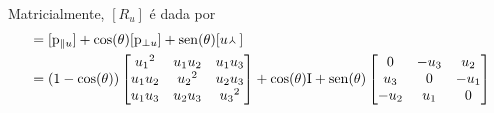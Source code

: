 Matricialmente, $[R_u]$ é dada por
%
	\begin{align*}
	[R_u] &= [\proj_{\parallel u}] + \cos(\theta)[\proj_{\perp u}] + \sin(\theta)[\pvec{u\!}{}] \\
	&=
	(1-\cos(\theta))
	\begin{bmatrix}
			{u_1}^2 & u_1u_2 & u_1u_3 \\
			u_1u_2 & {u_2}^2 & u_2u_3 \\
			u_1u_3 & u_2u_3 & {u_3}^2
	\end{bmatrix}
	+
	\cos(\theta)\Id + \sin(\theta)
	\begin{bmatrix}
			0 & -u_3 & u_2 \\
			u_3 & 0 & -u_1 \\
			-u_2 & u_1 & 0
	\end{bmatrix}
	\end{align*}







